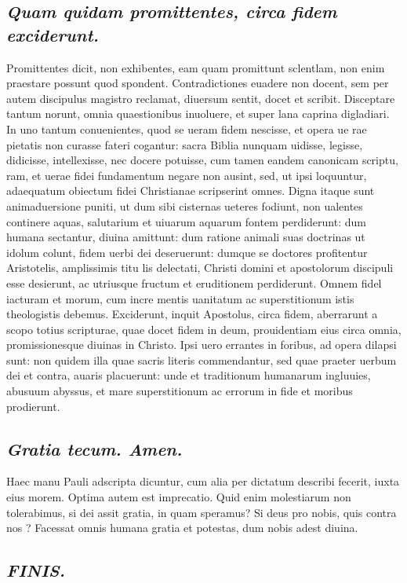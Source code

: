 \documentclass{article}
\begin{document}
\begin{pages}
\subsection*{\textit{Quam quidam promittentes, circa fidem exciderunt. }}\pstart Promittentes dicit, non exhibentes, eam quam promittunt sclentlam, non enim praestare possunt quod spondent. Contradictiones euadere non docent, sem per autem discipulus magistro reclamat, diuersum sentit, docet et scribit. Disceptare tantum norunt, omnia quaestionibus inuoluere, et super lana caprina digladiari. In uno tantum conuenientes, quod se ueram fidem nescisse, et opera ue rae pietatis non curasse fateri cogantur: sacra Biblia nunquam uidisse, legisse, didicisse, intellexisse, nec docere potuisse, cum tamen eandem canonicam scriptu, ram, et uerae fidei fundamentum negare non ausint, sed, ut ipsi loquuntur, adaequatum obiectum fidei Christianae scripserint omnes. Digna itaque sunt animaduersione puniti, ut dum sibi cisternas ueteres fodiunt, non ualentes continere aquas, salutarium et uiuarum aquarum fontem perdiderunt: dum humana sectantur, diuina amittunt: dum ratione animali suas doctrinas ut idolum colunt, fidem uerbi dei deseruerunt: dumque se doctores profitentur Aristotelis, amplissimis titu lis delectati, Christi domini et apostolorum discipuli esse desierunt, ac utriusque fructum et eruditionem perdiderunt. Omnem fidel iacturam et morum, cum incre mentis uanitatum ac superstitionum istis theologistis debemus. Exciderunt, inquit Apostolus, circa fidem, aberrarunt a scopo totius scripturae, quae docet fidem in deum, prouidentiam eius circa omnia, promissionesque diuinas in Christo. Ipsi uero errantes in foribus, ad opera dilapsi sunt: non quidem illa quae sacris literis commendantur, sed quae praeter uerbum dei et contra, auaris placuerunt: unde et traditionum humanarum ingluuies, abusuum abyssus, et mare superstitionum ac errorum in fide et moribus prodierunt.  \pend
{}
{}
\subsection*{\textit{Gratia tecum. Amen. }}\pstart Haec manu Pauli adscripta dicuntur, cum alia per dictatum describi fecerit, iuxta eius morem. Optima autem est imprecatio. Quid enim molestiarum non tolerabimus, si dei assit gratia, in quam speramus? Si deus pro nobis, quis contra nos ? Facessat omnis humana gratia et potestas, dum nobis adest diuina.  \pend
{}
{}
\subsection*{\textit{FINIS. }}
\endnumbering
\end{pages}
\end{document}
